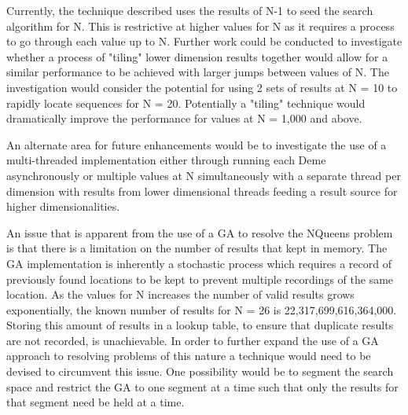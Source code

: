 \documentclass[conference]{IEEEtran}
\begin{document}
Currently, the technique described uses the results of N-1 to seed the search algorithm for N. This is restrictive at higher values for N as it requires a process to go through each value up to N. Further work could be conducted to investigate whether a process of "tiling" lower dimension results together would allow for a similar performance to be achieved with larger jumps between values of N. The investigation would consider the potential for using 2 sets of results at N = 10 to rapidly locate sequences for N = 20. Potentially a "tiling" technique would dramatically improve the performance for values at N = 1,000 and above.

An alternate area for future enhancements would be to investigate the use of a multi-threaded implementation either through running each Deme asynchronously or multiple values at N simultaneously with a separate thread per dimension with results from lower dimensional threads feeding a result source for higher dimensionalities.

An issue that is apparent from the use of a GA to resolve the NQueens problem is that there is a limitation on the number of results that kept in memory. The GA implementation is inherently a stochastic process which requires a record of previously found locations to be kept to prevent multiple recordings of the same location. As the values for N increases the number of valid results grows exponentially, the known number of results for N = 26 is 22,317,699,616,364,000. Storing this amount of results in a lookup table, to ensure that duplicate results are not recorded, is unachievable. In order to further expand the use of a GA approach to resolving problems of this nature a technique would need to be devised to circumvent this issue. One possibility would be to segment the search space and restrict the GA to one segment at a time such that only the results for that segment need be held at a time.
\end{document}
